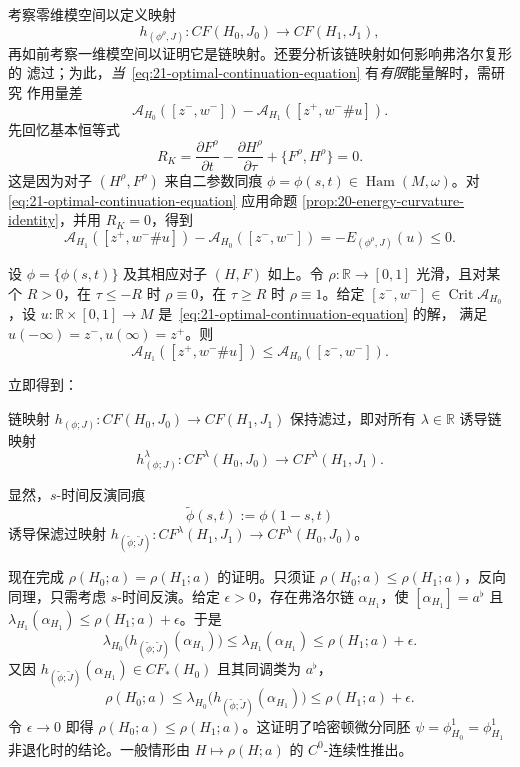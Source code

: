 考察零维模空间以定义映射
\[
 h_{(\phi^\rho,J)}:CF(H_0,J_0)\longrightarrow CF(H_1,J_1),
\]
再如前考察一维模空间以证明它是链映射。还要分析该链映射如何影响弗洛尔复形的
滤过；为此，\emph{当}~\eqref{eq:21-optimal-continuation-equation} 有\emph{有限}能量解时，需研究
作用量差
\[
 \mathcal A_{H_0}([z^-,w^-])-
 \mathcal A_{H_1}([z^+,w^-\#u]).
\]
先回忆基本恒等式
\begin{equation}
 R_K=\frac{\partial F^\rho}{\partial t}
 -\frac{\partial H^\rho}{\partial\tau}
 +\{F^\rho,H^\rho\}=0.
 \label{eq:21-flat-curvature-identity}
\end{equation}
这是因为对子 $(H^\rho,F^\rho)$ 来自二参数同痕
$\phi=\phi(s,t)\in\operatorname{Ham}(M,\omega)$。对
\eqref{eq:21-optimal-continuation-equation} 应用命题
\ref{prop:20-energy-curvature-identity}，并用 $R_K=0$，得到
\[
 \mathcal A_{H_1}([z^+,w^-\#u])-\mathcal A_{H_0}([z^-,w^-])
 =-E_{(\phi^\rho,J)}(u)\leq0.
\]

\begin{proposition}
\label{prop:21-optimal-continuation-action}
设 $\phi=\{\phi(s,t)\}$ 及其相应对子 $(H,F)$ 如上。令
$\rho:\mathbb R\to[0,1]$ 光滑，且对某个 $R>0$，在 $\tau\leq-R$ 时
$\rho\equiv0$，在 $\tau\geq R$ 时 $\rho\equiv1$。给定
$[z^-,w^-]\in\operatorname{Crit}\mathcal A_{H_0}$，设
$u:\mathbb R\times[0,1]\to M$ 是~\eqref{eq:21-optimal-continuation-equation} 的解，
满足 $u(-\infty)=z^-,u(\infty)=z^+$。则
\begin{equation}
 \mathcal A_{H_1}([z^+,w^-\#u])
 \leq\mathcal A_{H_0}([z^-,w^-]).
 \label{eq:21-optimal-continuation-action-bound}
\end{equation}
\end{proposition}

立即得到：

\begin{corollary}
\label{cor:21-optimal-continuation-filtration}
链映射 $h_{(\phi;J)}:CF(H_0,J_0)\to CF(H_1,J_1)$ 保持滤过，即对所有
$\lambda\in\mathbb R$ 诱导链映射
\[
 h_{(\phi;J)}^\lambda:CF^\lambda(H_0,J_0)
 \longrightarrow CF^\lambda(H_1,J_1).
\]
\end{corollary}

显然，$s$-时间反演同痕
\[
 \widetilde\phi(s,t):=\phi(1-s,t)
\]
诱导保滤过映射
$h_{(\widetilde\phi;\widetilde J)}:
CF^\lambda(H_1,J_1)\to CF^\lambda(H_0,J_0)$。

现在完成 $\rho(H_0;a)=\rho(H_1;a)$ 的证明。只须证
$\rho(H_0;a)\leq\rho(H_1;a)$，反向同理，只需考虑 $s$-时间反演。给定
$\epsilon>0$，存在弗洛尔链 $\alpha_{H_1}$，使
$[\alpha_{H_1}]=a^\flat$ 且
$\lambda_{H_1}(\alpha_{H_1})\leq\rho(H_1;a)+\epsilon$。于是
\[
 \lambda_{H_0}\bigl(h_{(\widetilde\phi;\widetilde J)}(\alpha_{H_1})\bigr)
 \leq\lambda_{H_1}(\alpha_{H_1})\leq\rho(H_1;a)+\epsilon.
\]
又因 $h_{(\widetilde\phi;\widetilde J)}(\alpha_{H_1})\in CF_*(H_0)$ 且其同调类为
$a^\flat$，
\[
 \rho(H_0;a)
 \leq\lambda_{H_0}\bigl(h_{(\widetilde\phi;\widetilde J)}(\alpha_{H_1})\bigr)
 \leq\rho(H_1;a)+\epsilon.
\]
令 $\epsilon\to0$ 即得 $\rho(H_0;a)\leq\rho(H_1;a)$。这证明了哈密顿微分同胚
$\psi=\phi_{H_0}^1=\phi_{H_1}^1$ 非退化时的结论。一般情形由
$H\mapsto\rho(H;a)$ 的 $C^0$-连续性推出。
